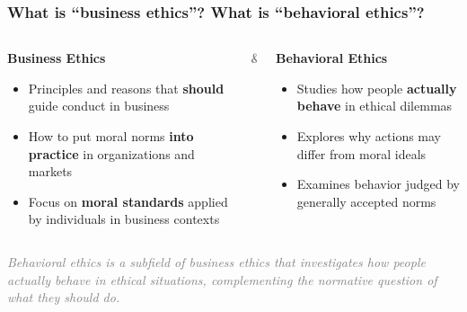 \documentclass[aspectratio=169, 10pt]{beamer}
\begin{document}
\begin{frame}
\frametitle{What is “business ethics”? What is “behavioral ethics”?}

\begin{columns}[T,onlytextwidth]
  \begin{column}{0.48\textwidth}
    \textcolor{WHUblue}{\Large\textbf{Business Ethics}}
    \vspace{0.5em}
    \begin{itemize}
      \item Principles and reasons that \textbf{should} guide conduct in business
      \item How to put moral norms \textbf{into practice} in organizations and markets
      \item Focus on \textbf{moral standards} applied by individuals in business contexts
    \end{itemize}
  \end{column}
  \begin{column}{0.04\textwidth}
    \centering
    \vspace{2em}
    \textcolor{gray}{\Large\textbf{\&}}
  \end{column}
  \begin{column}{0.48\textwidth}
    \textcolor{WHUblue}{\Large\textbf{Behavioral Ethics}}
    \vspace{0.5em}
    \begin{itemize}
      \item Studies how people \textbf{actually behave} in ethical dilemmas
      \item Explores why actions may differ from moral ideals
      \item Examines behavior judged by generally accepted norms
    \end{itemize}
  \end{column}
\end{columns}

\vspace{1em}
\centering
\textcolor{gray}{\footnotesize\textit{Behavioral ethics is a subfield of business ethics that investigates how people actually behave in ethical situations, complementing the normative question of what they should do.}}
\end{frame}
\end{document}
